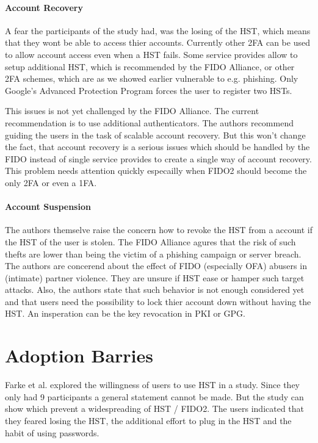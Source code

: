 \documentclass[runningheads]{llncs}
\begin{document}
\paragraph{Account Recovery}
A fear the participants of the study had, was the losing of the HST, which means that they wont be able to access thier accounts. Currently other 2FA can be used to allow account access even when a HST fails. Some service provides allow to setup additional HST, which is recommended by the FIDO Alliance, or other 2FA schemes, which are as we showed earlier vulnerable to e.g. phishing. Only Google's Advanced Protection Program forces the user to register two HSTs.

This issues is not yet challenged by the FIDO Alliance. The current recommendation is to use additional authenticators. The authors recommend guiding the users in the task of scalable account recovery. But this won't change the fact, that account recovery is a serious issues which should be handled by the FIDO instead of single service provides to create a single way of account recovery. This problem needs attention quickly especailly when FIDO2 should become the only 2FA or even a 1FA. 

\paragraph{Account Suspension}
The authors themselve raise the concern how to revoke the HST from a account if the HST of the user is stolen. The FIDO Alliance agures that the risk of such thefts are lower than being the victim of a phishing campaign or server breach. The authors are concerend about the effect of FIDO (especially OFA) abusers in (intimate) partner violence. They are unsure if HST ease or hamper such target attacks. Also, the authors state that such behavior is not enough considered yet and that users need the possibility to lock thier account down without having the HST. An insperation can be the key revocation in PKI or GPG. 

\section{Adoption Barries}
Farke et al. explored the willingness of users to use HST in a study. Since they only had 9 participants a general statement cannot be made. But the study can show which prevent a widespreading of HST / FIDO2. The users indicated that they feared losing the HST, the additional effort to plug in the HST and the habit of using passwords.
\end{document}
